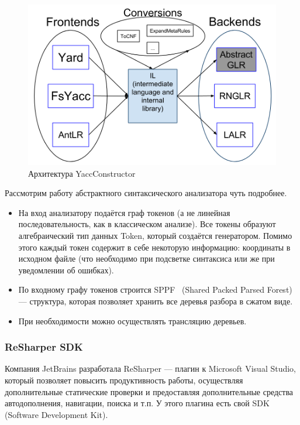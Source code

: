 \begin{figure}[t]
\centering
\includegraphics[width=\linewidth]{Ivanov/Pictures/YC_base.png}
\caption{Архитектура YaccConstructor}
\end{figure}

Рассмотрим работу абстрактного синтаксического анализатора чуть подробнее. 
\begin{itemize}
\item
{
На вход анализатору подаётся граф токенов (а не линейная последовательность, как в классическом анализе). Все токены образуют алгебраический тип данных Token, который создаётся генератором. Помимо этого каждый токен содержит в себе некоторую информацию: координаты в исходном файле (что необходимо при подсветке синтаксиса или же при уведомлении об ошибках).
}
\item
{По входному графу токенов строится SPPF~\cite{RNGLR} (Shared Packed Parsed Forest) --- структура, которая позволяет хранить все деревья разбора в сжатом виде. 
}
\item При необходимости можно осуществлять трансляцию деревьев. 
\end{itemize}

\subsubsection{ReSharper SDK}

Компания JetBrains разработала ReSharper --- плагин к Microsoft Visual Studio, который позволяет повысить продуктивность работы, осуществляя дополнительные статические проверки и предоставляя дополнительные средства автодополнения, навигации, поиска и т.п.
У этого плагина есть свой SDK (Software Development Kit).  

